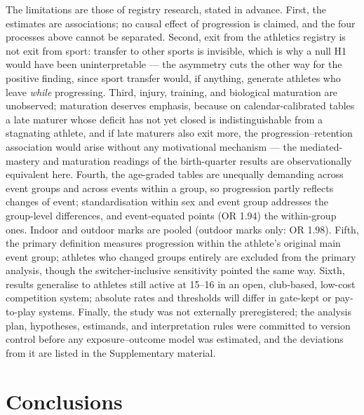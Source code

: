 \documentclass[12pt,a4paper]{article}
\begin{document}
The limitations are those of registry research, stated in advance. First, the estimates are associations; no causal effect of progression is claimed, and the four processes above cannot be separated. Second, exit from the athletics registry is not exit from sport: transfer to other sports is invisible, which is why a null H1 would have been uninterpretable --- the asymmetry cuts the other way for the positive finding, since sport transfer would, if anything, generate athletes who leave \emph{while} progressing. Third, injury, training, and biological maturation are unobserved; maturation deserves emphasis, because on calendar-calibrated tables a late maturer whose deficit has not yet closed is indistinguishable from a stagnating athlete, and if late maturers also exit more, the progression--retention association would arise without any motivational mechanism --- the mediated-mastery and maturation readings of the birth-quarter results are observationally equivalent here. Fourth, the age-graded tables are unequally demanding across event groups and across events within a group, so progression partly reflects changes of event; standardisation within sex and event group addresses the group-level differences, and event-equated points (OR 1.94) the within-group ones. Indoor and outdoor marks are pooled (outdoor marks only: OR 1.98). Fifth, the primary definition measures progression within the athlete's original main event group; athletes who changed groups entirely are excluded from the primary analysis, though the switcher-inclusive sensitivity pointed the same way. Sixth, results generalise to athletes still active at 15--16 in an open, club-based, low-cost competition system; absolute rates and thresholds will differ in gate-kept or pay-to-play systems. Finally, the study was not externally preregistered; the analysis plan, hypotheses, estimands, and interpretation rules were committed to version control before any exposure--outcome model was estimated, and the deviations from it are listed in the Supplementary material.

\section{Conclusions}
\end{document}
